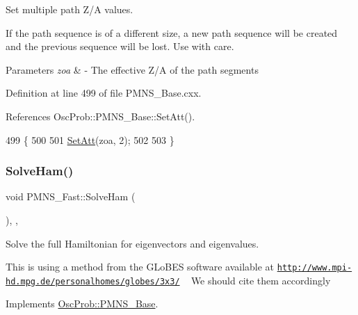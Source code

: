 Set multiple path Z/A values.

If the path sequence is of a different size, a new path sequence will be created and the previous sequence will be lost. Use with care.


\begin{DoxyParams}{Parameters}
{\em zoa} & -\/ The effective Z/A of the path segments \\
\hline
\end{DoxyParams}


Definition at line 499 of file P\+M\+N\+S\+\_\+\+Base.\+cxx.



References Osc\+Prob\+::\+P\+M\+N\+S\+\_\+\+Base\+::\+Set\+Att().


\begin{DoxyCode}
499                                            \{
500 
501   \hyperlink{classOscProb_1_1PMNS__Base_aba565962a440d14bee7a2a96d2eca2c5}{SetAtt}(zoa, 2);
502 
503 \}
\end{DoxyCode}
\mbox{\label{classOscProb_1_1PMNS__Fast_a8a0828401591e88c60e0051fbfe02d5e}} 
\subsubsection{\texorpdfstring{Solve\+Ham()}{SolveHam()}}
{\footnotesize\ttfamily void P\+M\+N\+S\+\_\+\+Fast\+::\+Solve\+Ham (\begin{DoxyParamCaption}{ }\end{DoxyParamCaption})\hspace{0.3cm}{\ttfamily [protected]}, {\ttfamily [virtual]}, {\ttfamily [inherited]}}

Solve the full Hamiltonian for eigenvectors and eigenvalues.

This is using a method from the G\+Lo\+B\+ES software available at \href{http://www.mpi-hd.mpg.de/personalhomes/globes/3x3/}{\tt http\+://www.\+mpi-\/hd.\+mpg.\+de/personalhomes/globes/3x3/} ~\newline
We should cite them accordingly 

Implements \hyperlink{classOscProb_1_1PMNS__Base_a91f065cb9e910e0095e41462b4420b01}{Osc\+Prob\+::\+P\+M\+N\+S\+\_\+\+Base}.



